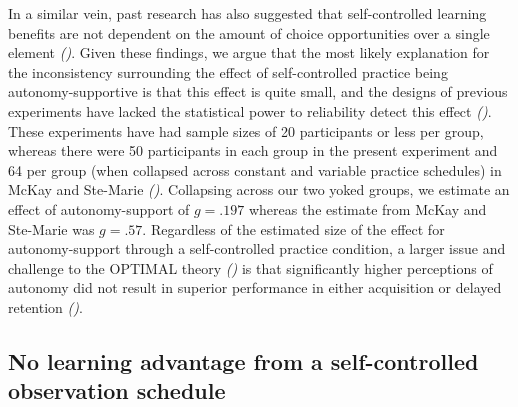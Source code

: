 \documentclass[
  english,
  jou]{apa7}
\begin{document}
In a similar vein, past research has also suggested that self-controlled learning benefits are not dependent on the amount of choice opportunities over a single element \emph{()}. Given these findings, we argue that the most likely explanation for the inconsistency surrounding the effect of self-controlled practice being autonomy-supportive is that this effect is quite small, and the designs of previous experiments have lacked the statistical power to reliability detect this effect \emph{()}. These experiments have had sample sizes of 20 participants or less per group, whereas there were 50 participants in each group in the present experiment and 64 per group (when collapsed across constant and variable practice schedules) in McKay and Ste-Marie \emph{()}. Collapsing across our two yoked groups, we estimate an effect of autonomy-support of \(g = .197\) whereas the estimate from McKay and Ste-Marie was \(g = .57\). Regardless of the estimated size of the effect for autonomy-support through a self-controlled practice condition, a larger issue and challenge to the OPTIMAL theory \emph{()} is that significantly higher perceptions of autonomy did not result in superior performance in either acquisition or delayed retention \emph{()}.

\hypertarget{no-learning-advantage-from-a-self-controlled-observation-schedule}{%
\subsection{No learning advantage from a self-controlled observation schedule}\label{no-learning-advantage-from-a-self-controlled-observation-schedule}}
\end{document}
